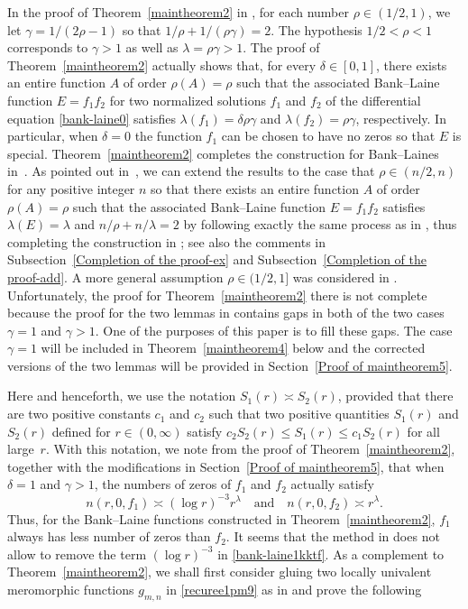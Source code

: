 \documentclass[12pt]{amsart}
\numberwithin{equation}{section}
\begin{document}
In the proof of Theorem~\ref{maintheorem2} in \cite{Zhang2024}, for each number $\rho\in(1/2,1)$, we let $\gamma=1/(2\rho-1)$ so that $1/\rho+1/(\rho\gamma)=2$. The hypothesis $1/2<\rho<1$ corresponds to $\gamma>1$ as well as $\lambda=\rho\gamma>1$. The proof of Theorem~\ref{maintheorem2} actually shows that, for every $\delta\in[0,1]$, there exists an entire function $A$ of order $\rho(A)=\rho$ such that the associated Bank--Laine function $E=f_1f_2$ for two normalized solutions $f_1$ and $f_2$ of the differential equation \eqref{bank-laine0} satisfies $\lambda(f_1)=\delta\rho\gamma$ and $\lambda(f_2)=\rho\gamma$, respectively. In particular, when $\delta=0$ the function $f_1$ can be chosen to have no zeros so that $E$ is special. Theorem~\ref{maintheorem2} completes the construction for Bank--Laines in~\cite[Corollary~1.1]{Bergweilereremenko2019}. As pointed out in~\cite{Zhang2024}, we can extend the results to the case that $\rho\in(n/2,n)$ for any positive integer $n$ so that there exists an entire function $A$ of order $\rho(A)=\rho$ such that the associated Bank--Laine function $E=f_1f_2$ satisfies $\lambda(E)=\lambda$ and $n/\rho+n/\lambda=2$ by following exactly the same process as in \cite[Section~5]{Bergweilereremenko2019}, thus completing the construction in \cite[Corollary~1.2]{Bergweilereremenko2019}; see also the comments in Subsection~\ref{Completion of the proof-ex} and Subsection~\ref{Completion of the proof-add}.
A more general assumption $\rho\in(1/2,1]$ was considered in \cite{Zhang2024}. Unfortunately, the proof for Theorem~\ref{maintheorem2} there is not complete because the proof for the two lemmas in \cite[Lemma~2.1 and Lemma~2.2]{Zhang2024} contains gaps in both of the two cases $\gamma=1$ and $\gamma>1$. One of the purposes of this paper is to fill these gaps. The case $\gamma=1$ will be included in Theorem~\ref{maintheorem4} below and the corrected versions of the two lemmas will be provided in Section~\ref{Proof of maintheorem5}.

Here and henceforth, we use the notation $S_1(r)\asymp S_2(r)$, provided that there are two positive constants $c_1$ and $c_2$ such that two positive quantities $S_1(r)$ and $S_2(r)$ defined for $r\in(0,\infty)$ satisfy $c_2 S_2(r)\leq S_1(r)\leq c_1S_2(r)$ for all large~$r$. With this notation, we note from the proof of Theorem~\ref{maintheorem2}, together with the modifications in Section~\ref{Proof of maintheorem5}, that when $\delta=1$ and $\gamma>1$, the numbers of zeros of $f_1$ and $f_2$ actually satisfy
\begin{equation}\label{bank-laine1kktf}
n(r,0,f_1)\asymp (\log r)^{-3}r^{\lambda} \quad \text{and} \quad n(r,0,f_2)\asymp r^{\lambda}.
\end{equation}
Thus, for the Bank--Laine functions constructed in Theorem~\ref{maintheorem2}, $f_1$ always has less number of zeros than $f_2$. It seems that the method in \cite{Zhang2024} does not allow to remove the term $(\log r)^{-3}$ in \eqref{bank-laine1kktf}. As a complement to Theorem~\ref{maintheorem2}, we shall first consider gluing two locally univalent meromorphic functions $g_{m,n}$ in \eqref{recuree1pm9} as in \cite{Bergweilereremenko2017} and prove the following
\end{document}
